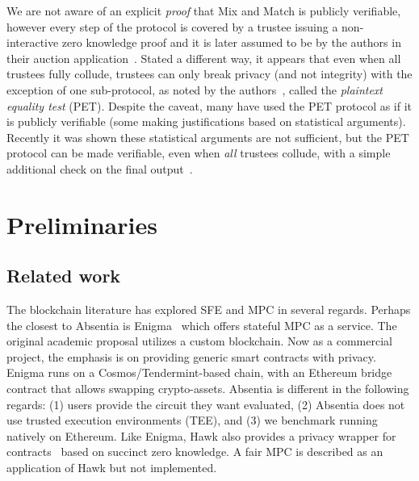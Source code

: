 We are not aware of an explicit \emph{proof} that Mix and Match is publicly verifiable, however every step of the protocol is covered by a trustee issuing a non-interactive zero knowledge proof and it is later assumed to be by the authors in their auction application~\cite{JJ00}. Stated a different way, it appears that even when all trustees fully collude, trustees can only break privacy (and not integrity) with the exception of one sub-protocol, as noted by the authors~\cite{JJ00}, called the \emph{plaintext equality test} (PET). Despite the caveat, many have used the PET protocol as if it is publicly verifiable (some making justifications based on statistical arguments). Recently it was shown these statistical arguments are not sufficient, but the PET protocol can be made verifiable, even when \emph{all} trustees collude, with a simple additional check on the final output~\cite{mcmurtry2020test}.


\section{Preliminaries}


\subsection{Related work}
\label{sec:lit}

The blockchain literature has explored SFE and MPC in several regards. Perhaps the closest to Absentia is Enigma~\cite{zyskind2015decentralizing} which offers stateful MPC as a service. The original academic proposal utilizes a custom blockchain. Now as a commercial project, the emphasis is on providing generic smart contracts with privacy. Enigma runs on a Cosmos/Tendermint-based chain, with an Ethereum bridge contract that allows swapping crypto-assets. Absentia is different in the following regards: (1) users provide the circuit they want evaluated, (2) Absentia does not use trusted execution environments (TEE), and (3) we benchmark running natively on Ethereum. Like Enigma, Hawk also provides a privacy wrapper for contracts~\cite{kosba2016hawk} based on succinct zero knowledge. A fair MPC is described as an application of Hawk but not implemented.  



